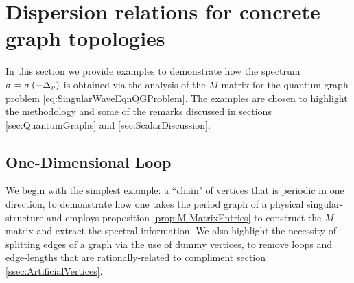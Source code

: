 \section{Dispersion relations for concrete graph topologies} \label{sec:ScalarExamples}
In this section we provide examples to demonstrate how the spectrum $\sigma=\sigma\left( -\Delta_{\upsilon} \right)$ is obtained via the analysis of the $M$-matrix for the quantum graph problem \eqref{eq:SingularWaveEqnQGProblem}.
The examples are chosen to highlight the methodology and some of the remarks discussed in sections \ref{sec:QuantumGraphs} and \ref{sec:ScalarDiscussion}.

\subsection{One-Dimensional Loop} \label{ssec:Example1DLoop}
We begin with the simplest example: a ``chain" of vertices that is periodic in one direction, to demonstrate how one takes the period graph of a physical singular-structure and employs proposition \ref{prop:M-MatrixEntries} to construct the $M$-matrix and extract the spectral information.
We also highlight the necessity of splitting edges of a graph via the use of dummy vertices, to remove loops and edge-lengths that are rationally-related to compliment section \ref{ssec:ArtificialVertices}.

